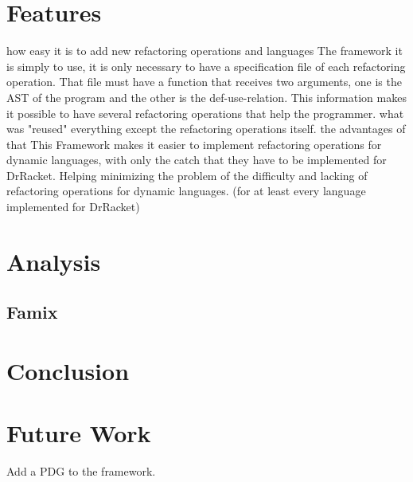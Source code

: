 \section{Features}
how easy it is to add new refactoring operations and languages
The framework it is simply to use, it is only necessary to have a specification file
of each refactoring operation.
That file must have a function that receives two arguments,
one is the AST of the program and the other is the def-use-relation.
This information makes it possible to have several refactoring operations that help
the programmer.
what was "reused"
everything except the refactoring operations itself.
the advantages of that
This Framework makes it easier to implement refactoring operations for dynamic languages,
with only the catch that they have to be implemented for DrRacket. Helping minimizing
the problem of the difficulty and lacking of refactoring operations for dynamic languages.
(for at least every language implemented for DrRacket)

\section{Analysis}
\subsection{Famix}

\section{Conclusion}
\section{Future Work}
Add a PDG to the framework.
